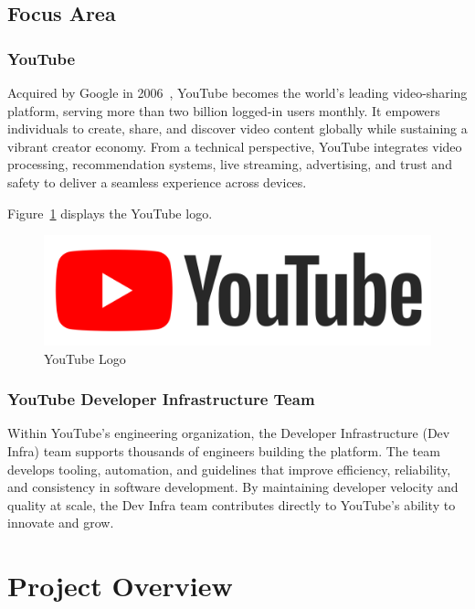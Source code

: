 \begin{spacing}{1.2}
\subsection{Focus Area} 
\subsubsection{YouTube}
Acquired by Google in 2006~\cite{youtube2024platform}, YouTube becomes the world's leading video-sharing platform, serving more than two billion logged-in users monthly. It empowers individuals to create, share, and discover video content globally while sustaining a vibrant creator economy. From a technical perspective, YouTube integrates video processing, recommendation systems, live streaming, advertising, and trust and safety to deliver a seamless experience across devices.

Figure~\ref{fig:youtube_logo} displays the YouTube logo.

\begin{figure}[!ht]\centering
\includegraphics[scale=0.06]{Images/youtube_logo.png}
\caption{YouTube Logo}
\label{fig:youtube_logo}
\end{figure}

\subsubsection{YouTube Developer Infrastructure Team}
Within YouTube’s engineering organization, the Developer Infrastructure (Dev Infra) team supports thousands of engineers building the platform. The team develops tooling, automation, and guidelines that improve efficiency, reliability, and consistency in software development. By maintaining developer velocity and quality at scale, the Dev Infra team contributes directly to YouTube’s ability to innovate and grow.




\section{Project Overview}


\end{spacing}

